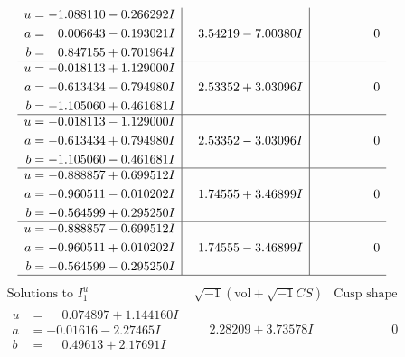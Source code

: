 \documentclass[1p]{elsarticle_modified}
\theoremstyle{definition}
\newcommand{\I}{\sqrt{-1}}
\begin{document}
$$\begin{array}{c|c|c}
\begin{aligned}
u &= -1.088110 - 0.266292 I \\
a &= \phantom{-}0.006643 - 0.193021 I \\
b &= \phantom{-}0.847155 + 0.701964 I\end{aligned}
 & \phantom{-}3.54219 - 7.00380 I & \phantom{-0.000000 } 0 \\ \hline\begin{aligned}
u &= -0.018113 + 1.129000 I \\
a &= -0.613434 - 0.794980 I \\
b &= -1.105060 + 0.461681 I\end{aligned}
 & \phantom{-}2.53352 + 3.03096 I & \phantom{-0.000000 } 0 \\ \hline\begin{aligned}
u &= -0.018113 - 1.129000 I \\
a &= -0.613434 + 0.794980 I \\
b &= -1.105060 - 0.461681 I\end{aligned}
 & \phantom{-}2.53352 - 3.03096 I & \phantom{-0.000000 } 0 \\ \hline\begin{aligned}
u &= -0.888857 + 0.699512 I \\
a &= -0.960511 - 0.010202 I \\
b &= -0.564599 + 0.295250 I\end{aligned}
 & \phantom{-}1.74555 + 3.46899 I & \phantom{-0.000000 } 0 \\ \hline\begin{aligned}
u &= -0.888857 - 0.699512 I \\
a &= -0.960511 + 0.010202 I \\
b &= -0.564599 - 0.295250 I\end{aligned}
 & \phantom{-}1.74555 - 3.46899 I & \phantom{-0.000000 } 0\\
 \hline 
 \end{array}$$\newpage$$\begin{array}{c|c|c}  
\text{Solutions to }I^u_{1}& \I (\text{vol} + \sqrt{-1}CS) & \text{Cusp shape}\\
 \hline 
\begin{aligned}
u &= \phantom{-}0.074897 + 1.144160 I \\
a &= -0.01616 - 2.27465 I \\
b &= \phantom{-}0.49613 + 2.17691 I\end{aligned}
 & \phantom{-}2.28209 + 3.73578 I & \phantom{-0.000000 } 0 \\ \hline\begin{aligned}

\end{aligned}
\end{array}$$
\end{document}

